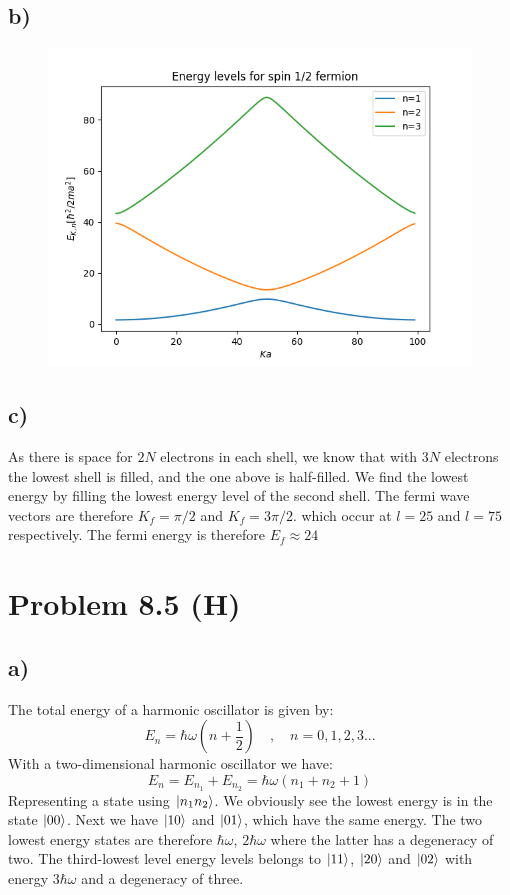 \documentclass{article}
\begin{document}
\subsection*{b)}
\begin{figure}[h!]
\centering
\includegraphics[width = .65\textwidth]{8.4.png}
\caption{}
\label{fig: 8.4}
\end{figure} 

\subsection*{c)}
As there is space for $2N$ electrons in each shell, we know that with $3N$ electrons the lowest shell is filled, and the one above is half-filled. We find the lowest energy by filling the lowest energy level of the second shell. The fermi wave vectors are therefore $K_f = π / 2$ and $K_f = 3π / 2$. which occur at $l = 25$ and $l = 75$ respectively. The fermi energy is therefore $E_f ≈ 24$


\section*{Problem 8.5 (H)}
\subsection*{a)}
The total energy of a harmonic oscillator is given by:
\[
E_n = ℏ ω \left(n + \frac{1}{2}\right) \quad , \quad n = 0,1,2,3...
\]
With a two-dimensional harmonic oscillator we have:
\[
E_n = E_{n_1} + E_{n_2} = ℏω(n_1 + n_2 + 1) 
\]
Representing a state using $\ket{n_1n_2}$. We obviously see the lowest energy is in the state $\ket{00}$. Next we have $\ket{10}$ and $\ket{01}$, which have the same energy. The two lowest energy states are therefore $ℏω$, $2ℏω$ where the latter has a degeneracy of two. The third-lowest level energy levels belongs to $\ket{11}$, $\ket{20}$ and $\ket{02}$ with energy $3ℏω$ and a degeneracy of three. 
\end{document}
